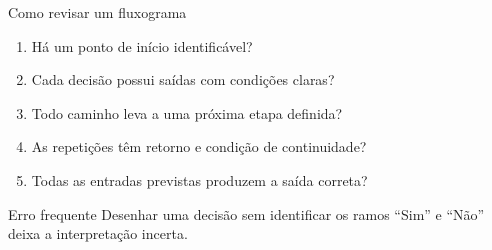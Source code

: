 \begin{frame}[t]{Como revisar um fluxograma}
\begin{enumerate}
\item Há um ponto de início identificável?
\item Cada decisão possui saídas com condições claras?
\item Todo caminho leva a uma próxima etapa definida?
\item As repetições têm retorno e condição de continuidade?
\item Todas as entradas previstas produzem a saída correta?
\end{enumerate}
\begin{alertblock}{Erro frequente}
Desenhar uma decisão sem identificar os ramos ``Sim'' e ``Não'' deixa a interpretação incerta.
\end{alertblock}
\end{frame}

